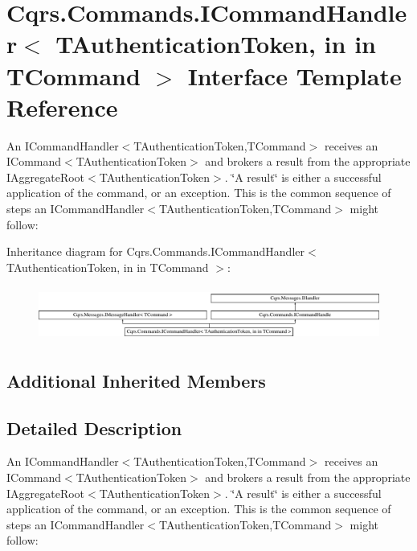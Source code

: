 \hypertarget{interfaceCqrs_1_1Commands_1_1ICommandHandler}{}\section{Cqrs.\+Commands.\+I\+Command\+Handler$<$ T\+Authentication\+Token, in in T\+Command $>$ Interface Template Reference}
\label{interfaceCqrs_1_1Commands_1_1ICommandHandler}


An I\+Command\+Handler$<$\+T\+Authentication\+Token,\+T\+Command$>$ receives an I\+Command$<$\+T\+Authentication\+Token$>$ and brokers a result from the appropriate I\+Aggregate\+Root$<$\+T\+Authentication\+Token$>$. \char`\"{}\+A result\char`\"{} is either a successful application of the command, or an exception. This is the common sequence of steps an I\+Command\+Handler$<$\+T\+Authentication\+Token,\+T\+Command$>$ might follow\+:  


Inheritance diagram for Cqrs.\+Commands.\+I\+Command\+Handler$<$ T\+Authentication\+Token, in in T\+Command $>$\+:\begin{figure}[H]
\begin{center}
\leavevmode
\includegraphics[height=1.810345cm]{interfaceCqrs_1_1Commands_1_1ICommandHandler}
\end{center}
\end{figure}
\subsection*{Additional Inherited Members}


\subsection{Detailed Description}
An I\+Command\+Handler$<$\+T\+Authentication\+Token,\+T\+Command$>$ receives an I\+Command$<$\+T\+Authentication\+Token$>$ and brokers a result from the appropriate I\+Aggregate\+Root$<$\+T\+Authentication\+Token$>$. \char`\"{}\+A result\char`\"{} is either a successful application of the command, or an exception. This is the common sequence of steps an I\+Command\+Handler$<$\+T\+Authentication\+Token,\+T\+Command$>$ might follow\+: 

